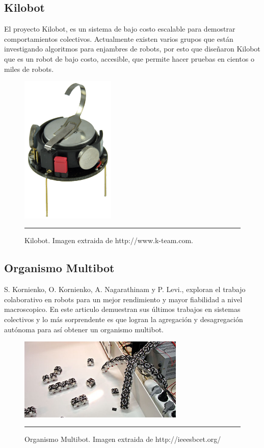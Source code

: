 \subsection{Kilobot}
El proyecto Kilobot, es un sistema de bajo costo escalable para demostrar comportamientos colectivos. Actualmente existen varios grupos que están investigando algoritmos para enjambres de robots, por esto que diseñaron Kilobot que es un robot de bajo costo, accesible,  que permite hacer pruebas en cientos o miles de robots.

\begin{figure}[htbp]
	\centering
		\includegraphics[width=0.4\textwidth]{./Figures/kilobot.jpg}
		\rule{35em}{0.5pt}
	\caption[Kilobot]{Kilobot. Imagen extraida de http://www.k-team.com.}
	\label{fig:kilobot}
\end{figure}




\subsection{Organismo Multibot}

S. Kornienko, O. Kornienko, A. Nagarathinam y P. Levi., exploran el trabajo colaborativo en robots para un mejor rendimiento y mayor fiabilidad a nivel macroscopico. En este articulo demuestran sus últimos trabajos en sistemas colectivos y lo más sorprendente es que logran la agregación y desagregación autónoma para así obtener un organismo multibot.
\cite{5359578}

\begin{figure}[htbp]
	\centering
		\includegraphics[width=0.7\textwidth]{./Figures/Multibot_organism.jpg}
		\rule{35em}{0.5pt}
	\caption[Organismo]{Organismo Multibot. Imagen extraida de http://ieeesbcet.org/}
	\label{fig:Organismo}
\end{figure}


